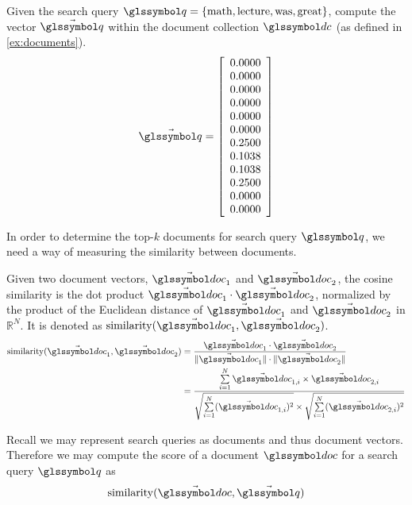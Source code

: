 		\begin{ex}
			Given the search query \(\q = \{\text{math}, \text{lecture}, \text{was}, \text{great}\}\), compute the vector \(\vec{\q}\) within the document collection \(\dc\) (as defined in \vref{ex:documents}).
			\[
				\vec{\q} = 
					\left[
						\begin{array}{c}
							0.0000 \\
							0.0000 \\
							0.0000 \\
							0.0000 \\
							0.0000 \\
							0.0000 \\
							0.2500 \\
							0.1038 \\
							0.1038 \\
							0.2500 \\
							0.0000 \\
							0.0000 \\
						\end{array}
					\right]
			\]
		\end{ex}
		
		In order to determine the top-\(k\) documents for search query \(\q\), we need a way of measuring the similarity between documents.
		
		\begin{defn}
			Given two document vectors, \(\vec{\doc}_1\) and \(\vec{\doc}_2\), the cosine similarity is the dot product \(\vec{\doc}_1 \cdot \vec{\doc}_2\), normalized by the product of the Euclidean distance of \(\vec{\doc}_1\) and \(\vec{\doc}_2\) in \(\mathbb{R}^N\).	It is denoted as \(\similarity(\vec{\doc}_1, \vec{\doc}_2)\).
			\begin{align}
				\similarity(\vec{\doc}_1, \vec{\doc}_2) &= \frac{\vec{\doc}_1 \cdot \vec{\doc}_2}{\norm{\vec{\doc}_1} \cdot \norm{\vec{\doc}_2}} \\
				 &= \frac{\sum\limits_{i=1}^{N} \vec{\doc}_{1, i} \times \vec{\doc}_{2, i}}{\sqrt{\sum\limits_{i=1}^{N} (\vec{\doc}_{1, i})^2} \times \sqrt{\sum\limits_{i=1}^{N} (\vec{\doc}_{2, i})^2}}
			\end{align}
		\end{defn}
		
		Recall we may represent search queries as documents and thus document vectors.	Therefore we may compute the score of a document \(\doc\) for a search query \(\q\) as
		\[
			\similarity(\vec{\doc}, \vec{\q})
		\]
		
